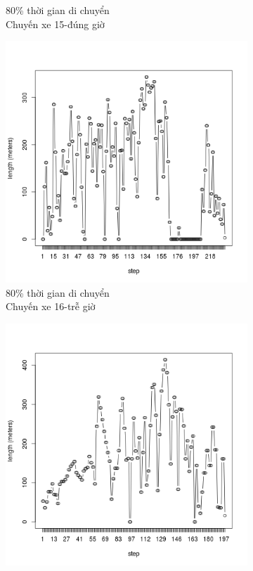 \documentclass[a4paper, 13pt]{report}
\begin{document}
\begin{figure}
\begin{subfigure}[b]{0.25\textwidth}
                \caption*{80\% thời gian di chuyển\\Chuyến xe 15-đúng giờ}
        \end{subfigure}%
        \begin{subfigure}[b]{0.25\textwidth}
                \includegraphics[width=\linewidth]{test16}
                \caption*{80\% thời gian di chuyển\\Chuyến xe 16-trễ giờ}
        \end{subfigure}
        \begin{subfigure}[b]{0.25\textwidth}
                \includegraphics[width=\linewidth]{test17}

\end{subfigure}
\end{figure}
\end{document}
